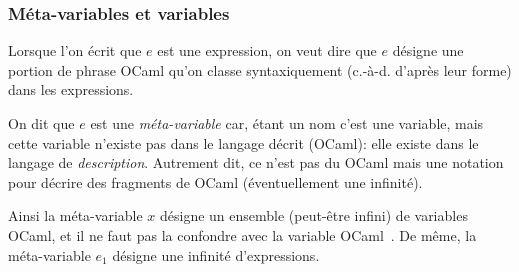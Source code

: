 %
\begin{frame}
\frametitle{Méta-variables et variables}

Lorsque l'on écrit que $e$ est une expression, on veut dire que $e$
désigne une portion de phrase OCaml qu'on classe syntaxiquement
(c.-à-d. d'après leur forme) dans les expressions.

\bigskip

On dit que $e$ est une \emph{méta-variable} car, étant un nom c'est
une variable, mais cette variable n'existe pas dans le langage décrit
(OCaml): elle existe dans le langage de \emph{description}. Autrement
dit, ce n'est pas du OCaml mais une notation pour décrire des
fragments de OCaml (éventuellement une infinité).

\bigskip

Ainsi la méta-variable $x$ désigne un ensemble (peut-être infini) de
variables OCaml, et il ne faut pas la confondre avec la variable
OCaml~. De même, la méta-variable $e_1$ désigne une infinité
d'expressions.

\end{frame}

